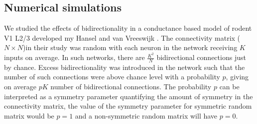 \subsection{Numerical simulations}
We studied the effects of bidirectionality in a conductance based model of rodent V1 L2/3 developed my Hansel and van Vreeswijk \cite{Hansel2012}. 
The connectivity matrix ($N \times N$)in their study was random with each neuron in the network receiving $K$ inputs on average. In such networks, there are $\frac{K^2}{N}$ bidirectional connections just by chance. Excess bidirectionality was introduced in the network such that the number of such connections were above chance level with a probability $p$, giving on average $pK$ number of bidirectional connections. The probability $p$ can be interpreted as a symmetry parameter quantifying the amount of symmetry in the connectivity matrix, the value of the symmetry parameter for symmetric random matrix would be $p = 1$ and a non-symmetric random matrix will have $p = 0$. %

